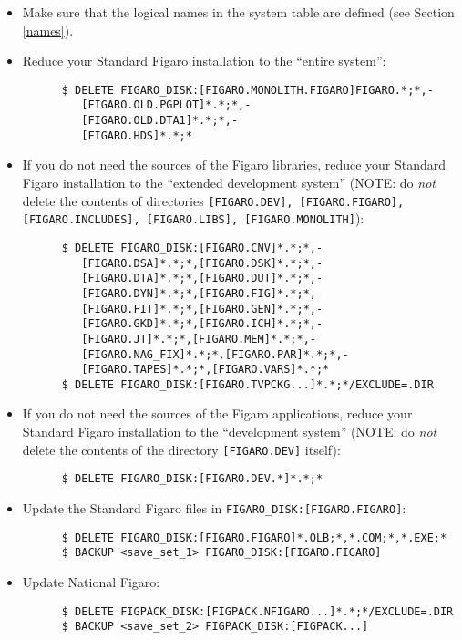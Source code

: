 \begin{itemize}

\item Make sure that the logical names in the system table are defined (see
Section \ref{names}).

\item Reduce your Standard Figaro installation to the ``entire system'':

\begin{verbatim}
      $ DELETE FIGARO_DISK:[FIGARO.MONOLITH.FIGARO]FIGARO.*;*,-
         [FIGARO.OLD.PGPLOT]*.*;*,-
         [FIGARO.OLD.DTA1]*.*;*,-
         [FIGARO.HDS]*.*;*
\end{verbatim}

\item If you do not need the sources of the Figaro libraries, reduce your
Standard Figaro installation to the ``extended development system'' (NOTE: do
{\it not} delete the contents of directories {\tt [FIGARO.\-DEV],
[FIGARO.\-FIGARO], [FIGARO.\-INCLUDES], [FIGARO.\-LIBS],
[FI\-GARO.\-MONOLITH]}):

\begin{verbatim}
      $ DELETE FIGARO_DISK:[FIGARO.CNV]*.*;*,-
         [FIGARO.DSA]*.*;*,[FIGARO.DSK]*.*;*,-
         [FIGARO.DTA]*.*;*,[FIGARO.DUT]*.*;*,-
         [FIGARO.DYN]*.*;*,[FIGARO.FIG]*.*;*,-
         [FIGARO.FIT]*.*;*,[FIGARO.GEN]*.*;*,-
         [FIGARO.GKD]*.*;*,[FIGARO.ICH]*.*;*,-
         [FIGARO.JT]*.*;*,[FIGARO.MEM]*.*;*,-
         [FIGARO.NAG_FIX]*.*;*,[FIGARO.PAR]*.*;*,-
         [FIGARO.TAPES]*.*;*,[FIGARO.VARS]*.*;*
      $ DELETE FIGARO_DISK:[FIGARO.TVPCKG...]*.*;*/EXCLUDE=.DIR
\end{verbatim}

\item If you do not need the sources of the Figaro applications, reduce your
Standard Figaro installation to the ``development system'' (NOTE: do {\it not}
delete the contents of the directory {\tt [FIGARO.\-DEV]} itself):

\begin{verbatim}
      $ DELETE FIGARO_DISK:[FIGARO.DEV.*]*.*;*
\end{verbatim}

\item Update the Standard Figaro files in {\tt FIGARO\_DISK:[FIGARO.FIGARO]}:

\begin{verbatim}
      $ DELETE FIGARO_DISK:[FIGARO.FIGARO]*.OLB;*,*.COM;*,*.EXE;*
      $ BACKUP <save_set_1> FIGARO_DISK:[FIGARO.FIGARO]
\end{verbatim}

\item Update National Figaro:

\begin{verbatim}
      $ DELETE FIGPACK_DISK:[FIGPACK.NFIGARO...]*.*;*/EXCLUDE=.DIR
      $ BACKUP <save_set_2> FIGPACK_DISK:[FIGPACK...]
\end{verbatim}

\end{itemize}


